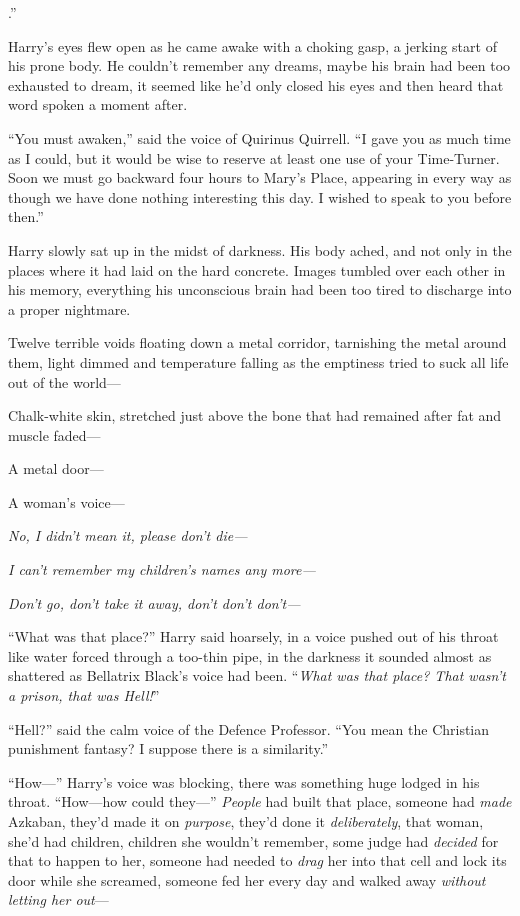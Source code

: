 
.”

\hplettrineextrapara
Harry’s eyes flew open as he came awake with a choking gasp, a jerking start of his prone body. He couldn’t remember any dreams, maybe his brain had been too exhausted to dream, it seemed like he’d only closed his eyes and then heard that word spoken a moment after.

“You must awaken,” said the voice of Quirinus Quirrell.
“I gave you as much time as I could, but it would be wise to reserve at least one use of your Time-Turner. Soon we must go backward four hours to Mary’s Place, appearing in every way as though we have done nothing interesting this day. I wished to speak to you before then.”

Harry slowly sat up in the midst of darkness. His body ached, and not only in the places where it had laid on the hard concrete. Images tumbled over each other in his memory, everything his unconscious brain had been too tired to discharge into a proper nightmare.

Twelve terrible voids floating down a metal corridor, tarnishing the metal around them, light dimmed and temperature falling as the emptiness tried to suck all life out of the world—

Chalk-white skin, stretched just above the bone that had remained after fat and muscle faded—

A metal door—

A woman’s voice—

\emph{No, I didn’t mean it, please don’t die—}

\emph{I can’t remember my children’s names any more—}

\emph{Don’t go, don’t take it away, don’t don’t don’t—}

“What was that place?” Harry said hoarsely, in a voice pushed out of his throat like water forced through a too-thin pipe, in the darkness it sounded almost as shattered as Bellatrix Black’s voice had been. “\emph{What was that place? That wasn’t a prison, that was \emph{Hell!}}”

“Hell?” said the calm voice of the Defence Professor.
“You mean the Christian punishment fantasy? I suppose there is a similarity.”

“How—” Harry’s voice was blocking, there was something huge lodged in his throat.
“How—how could they—” \emph{People} had built that place, someone had \emph{made} Azkaban, they’d made it on \emph{purpose}, they’d done it \emph{deliberately}, that woman, she’d had children, children she wouldn’t remember, some judge had \emph{decided} for that to happen to her, someone had needed to \emph{drag} her into that cell and lock its door while she screamed, someone fed her every day and walked away \emph{without letting her out}—

